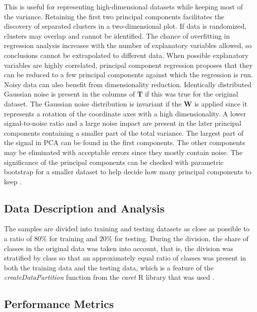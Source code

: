 \documentclass[preprint,12pt]{elsarticle}
\begin{document}
This is useful for representing high-dimensional datasets while keeping most of the variance. Retaining the first two principal components facilitates the discovery of separated clusters in a two-dimensional plot. If data is randomized, clusters may overlap and cannot be identified. The chance of overfitting in regression analysis increases with the number of explanatory variables allowed, so conclusions cannot be extrapolated to different data. When possible explanatory variables are highly correlated, principal component regression proposes that they can be reduced to a few principal components against which the regression is run. Noisy data can also benefit from dimensionality reduction. Identically distributed Gaussian noise is present in the columns of $\mathbf{T}$ if this was true for the original dataset. The Gaussian noise distribution is invariant if the $\mathbf{W}$ is applied since it represents a rotation of the coordinate axes with a high dimensionality. A lower signal-to-noise ratio and a large noise impact are present in the later principal components containing a smaller part of the total variance. The largest part of the signal in PCA can be found in the first components. The other components may be eliminated with acceptable errors since they mostly contain noise. The significance of the principal components can be checked with parametric bootstrap for a smaller dataset to help decide how many principal components to keep \cite{forkman2019hypothesis}.

\subsection{Data Description and Analysis}

The samples are divided into training and testing datasets as close as possible to a ratio of $80\%$ for training and $20\%$ for testing. During the division, the share of classes in the original data was taken into account, that is, the division was stratified by class so that an approximately equal ratio of classes was present in both the training data and the testing data, which is a feature of the \textit{createDataPartition} function from the \textit{caret} R library that was used \cite{topepoDataSplitting, hyndman2018forecasting, rdocumentationCreateDataPartitionFunction}.

\subsection{Performance Metrics}
\end{document}
